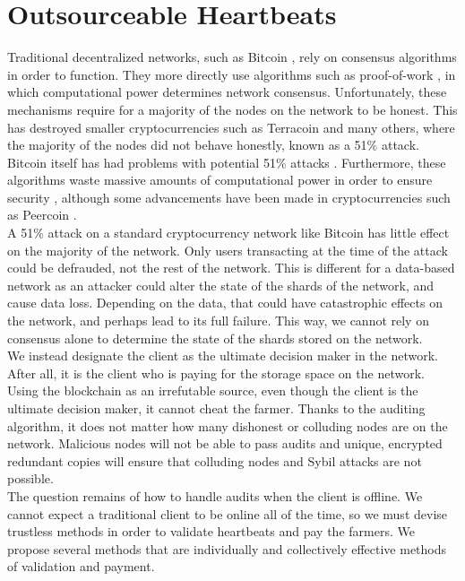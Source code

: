 \documentclass[a4paper,10pt]{article}
\begin{document}
\section{Outsourceable Heartbeats}
Traditional decentralized networks, such as Bitcoin \cite{3}, rely on consensus algorithms in order to function. They more directly use algorithms such as proof-of-work \cite{3}, in which computational power determines network consensus. Unfortunately, these mechanisms require for a majority of the nodes on the network to be honest. This has destroyed smaller cryptocurrencies such as Terracoin \cite{17} and many others, where the majority of the nodes did not behave honestly, known as a 51\% attack. Bitcoin itself has had problems with potential 51\% attacks \cite{18}. Furthermore, these algorithms waste massive amounts of computational power in order to ensure security \cite{19}, although some advancements have been made in cryptocurrencies such as Peercoin \cite{19}. \\

A 51\% attack on a standard cryptocurrency network like Bitcoin has little effect on the majority of the network. Only users transacting at the time of the attack could be defrauded, not the rest of the network. This is different for a data-based network as an attacker could alter the state of the shards of the network, and cause data loss. Depending on the data, that could have catastrophic effects on the network, and perhaps lead to its full failure. This way, we cannot rely on consensus alone to determine the state of the shards stored on the network. \\

We instead designate the client as the ultimate decision maker in the network. After all, it is the client who is paying for the storage space on the network. Using the blockchain as an irrefutable source, even though the client is the ultimate decision maker, it cannot cheat the farmer. Thanks to the auditing algorithm, it does not matter how many dishonest or colluding nodes are on the network. Malicious nodes will not be able to pass audits and unique, encrypted redundant copies will ensure that colluding nodes and Sybil attacks are not possible. \\

The question remains of how to handle audits when the client is offline. We cannot expect a traditional client to be online all of the time, so we must devise trustless methods in order to validate heartbeats and pay the farmers. We propose several methods that are individually and collectively effective methods of validation and payment. \\
\end{document}
